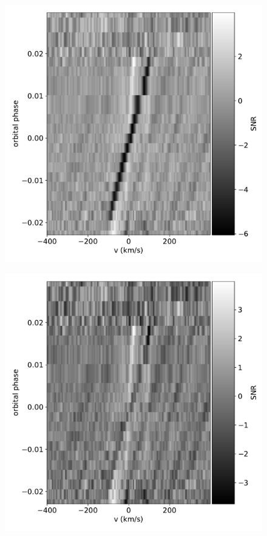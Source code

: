 \documentclass[twocolumn]{aastex631}
\begin{document}
            \begin{figure}[ht!]
                \centering
                \begin{minipage}[b]{0.45\textwidth}
                    \centering
                    \includegraphics[width=\textwidth]{plots/raw-ccf-before/KELT-20b.20190504.Fe.blue.CCFs-raw.pdf}
                    \label{fig:raw-ccf-before-Fe-blue}
                \end{minipage}
                \hspace{0.05\textwidth}
                \begin{minipage}[b]{0.45\textwidth}
                    \centering
                    \includegraphics[width=\textwidth]{plots/raw-ccf-after/KELT-20b.20190504.Fe.blue.CCFs-raw.pdf}

\end{minipage}
\end{figure}
\end{document}

